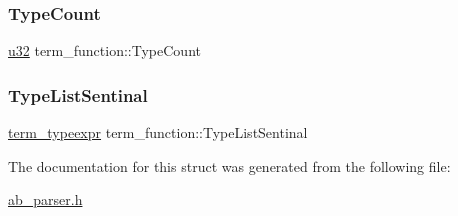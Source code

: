 \mbox{\label{structterm__function_a4e47cbfb96047c0ed4e06e87e079fb6a}} 
\subsubsection{\texorpdfstring{Type\+Count}{TypeCount}}
{\footnotesize\ttfamily \hyperlink{ab__common_8h_afaa62991928fb9fb18ff0db62a040aba}{u32} term\+\_\+function\+::\+Type\+Count}

\mbox{\label{structterm__function_a96b877553f990184a9da245207de9524}} 
\subsubsection{\texorpdfstring{Type\+List\+Sentinal}{TypeListSentinal}}
{\footnotesize\ttfamily \hyperlink{structterm__typeexpr}{term\+\_\+typeexpr} term\+\_\+function\+::\+Type\+List\+Sentinal}



The documentation for this struct was generated from the following file\+:\begin{DoxyCompactItemize}
\item 
\hyperlink{ab__parser_8h}{ab\+\_\+parser.\+h}\end{DoxyCompactItemize}
